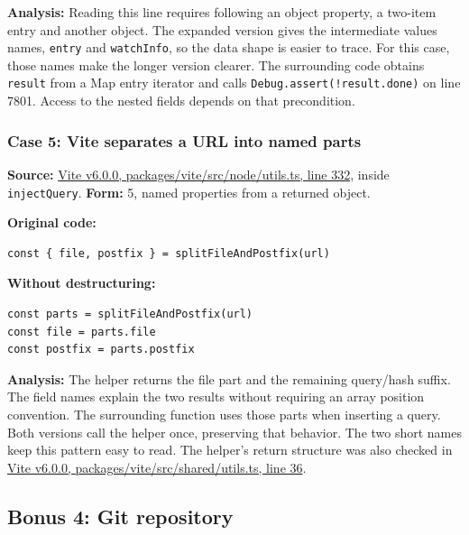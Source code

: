 \documentclass[
  11pt,
]{article}
\newcommand{\passthrough}[1]{#1}
\begin{document}
\textbf{Analysis:} Reading this line requires following an object
property, a two-item entry and another object. The expanded version
gives the intermediate values names, \passthrough{\lstinline!entry!} and
\passthrough{\lstinline!watchInfo!}, so the data shape is easier to
trace. For this case, those names make the longer version clearer. The
surrounding code obtains \passthrough{\lstinline!result!} from a Map
entry iterator and calls
\passthrough{\lstinline"Debug.assert(!result.done)"} on line 7801.
Access to the nested fields depends on that precondition.

\subsubsection{Case 5: Vite separates a URL into named
parts}\label{case-5-vite-separates-a-url-into-named-parts}

\textbf{Source:}
\href{https://github.com/vitejs/vite/blob/v6.0.0/packages/vite/src/node/utils.ts\#L332}{Vite
v6.0.0, packages/vite/src/node/utils.ts, line 332}, inside
\passthrough{\lstinline!injectQuery!}. \textbf{Form:} 5, named
properties from a returned object.

\textbf{Original code:}

\begin{lstlisting}
const { file, postfix } = splitFileAndPostfix(url)
\end{lstlisting}

\textbf{Without destructuring:}

\begin{lstlisting}
const parts = splitFileAndPostfix(url)
const file = parts.file
const postfix = parts.postfix
\end{lstlisting}

\textbf{Analysis:} The helper returns the file part and the remaining
query/hash suffix. The field names explain the two results without
requiring an array position convention. The surrounding function uses
those parts when inserting a query. Both versions call the helper once,
preserving that behavior. The two short names keep this pattern easy to
read. The helper's return structure was also checked in
\href{https://github.com/vitejs/vite/blob/v6.0.0/packages/vite/src/shared/utils.ts\#L36}{Vite
v6.0.0, packages/vite/src/shared/utils.ts, line 36}.

\subsection{Bonus 4: Git repository}\label{bonus-4-git-repository}
\end{document}
